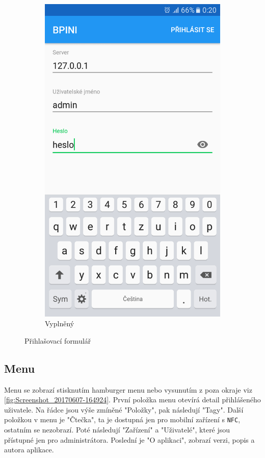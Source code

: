 \documentclass[czech,BP]{thesiskiv}
\begin{document}
\begin{figure}[H]
\begin{subfigure}[b]{0.3\textwidth}
	\includegraphics[width=\textwidth]{../images/client_android/Screenshot_20170612-002041.png}	
	\caption{Vyplněný}
	\label{fig:Screenshot_20170612-002041}
  \end{subfigure}
  \caption{Přihlašovací formulář}
\end{figure}

\subsection{Menu}
Menu se zobrazí stisknutím hamburger menu nebo vysunutím z poza okraje viz \ref{fig:Screenshot_20170607-164924}.
První položka menu otevírá detail přihlášeného uživatele.
Na  řádce jsou výše zmíněné "Položky", pak následují "Tagy".
Další položkou v menu je "Čtečka", ta je dostupná jen pro mobilní zařízení s \texttt{NFC}, ostatním se nezobrazí.
Poté následují "Zařízení" a "Uživatelé", které jsou přístupné jen pro administrátora.
Poslední je "O aplikaci", zobrazí verzi, popis a autora aplikace.
\end{document}
